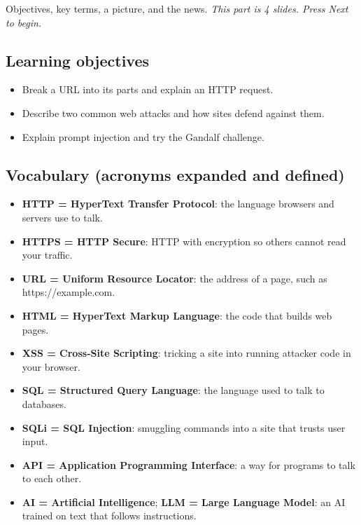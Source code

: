 \documentclass[12pt,openany]{book}
\begin{document}
Objectives, key terms, a picture, and the news.
{\small\itshape\color{gray}This part is 4 slides. Press Next to begin.}

\medskip

\subsection*{Learning objectives}


\begin{itemize}

  \item Break a URL into its parts and explain an HTTP request.

  \item Describe two common web attacks and how sites defend against them.

  \item Explain prompt injection and try the Gandalf challenge.

\end{itemize}

\medskip

\subsection*{Vocabulary (acronyms expanded and defined)}


\begin{itemize}

  \item \textbf{HTTP = HyperText Transfer Protocol}: the language browsers and servers use to talk.

  \item \textbf{HTTPS = HTTP Secure}: HTTP with encryption so others cannot read your traffic.

  \item \textbf{URL = Uniform Resource Locator}: the address of a page, such as https://example.com.

  \item \textbf{HTML = HyperText Markup Language}: the code that builds web pages.

  \item \textbf{XSS = Cross-Site Scripting}: tricking a site into running attacker code in your browser.

  \item \textbf{SQL = Structured Query Language}: the language used to talk to databases.

  \item \textbf{SQLi = SQL Injection}: smuggling commands into a site that trusts user input.

  \item \textbf{API = Application Programming Interface}: a way for programs to talk to each other.

  \item \textbf{AI = Artificial Intelligence}; \textbf{LLM = Large Language Model}: an AI trained on text that follows instructions.

\end{itemize}
\end{document}
